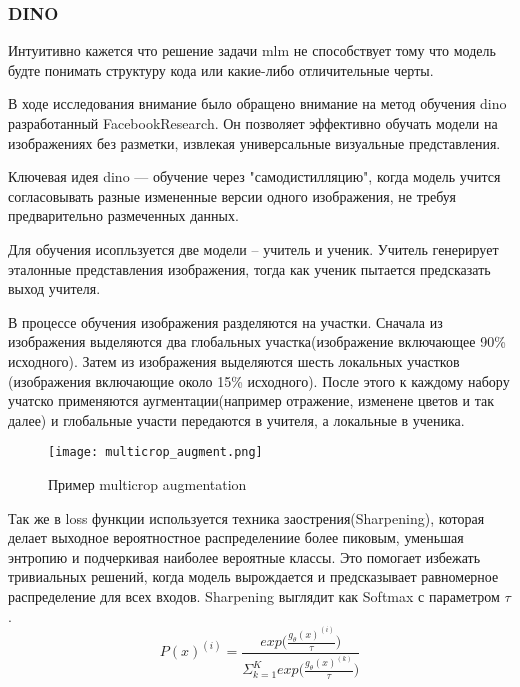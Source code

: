 \documentclass[../part_1.tex]{subfiles}
\begin{document}
    \subsubsection{DINO}

    \par Интуитивно кажется что решение задачи \acrshort{mlm} не способствует тому что модель будте понимать структуру кода или какие-либо отличительные черты. 
    \par В ходе исследования внимание было обращено внимание на метод обучения \acrshort{dino}\cite{caron2021emergingpropertiesselfsupervisedvision} разработанный FacebookResearch. Он позволяет эффективно обучать модели на изображениях без разметки, извлекая универсальные визуальные представления. 
    \par Ключевая идея \acrshort{dino} — обучение через "самодистилляцию", когда модель учится согласовывать разные измененные версии одного изображения, не требуя предварительно размеченных данных.
    \par Для обучения исопльзуется две модели -- учитель и ученик. Учитель генерирует эталонные представления изображения, тогда как ученик пытается предсказать выход учителя. 
    \par В процессе обучения изображения разделяются на участки. Сначала из изображения выделяются два глобальных участка(изображение включающее 90\% исходного). Затем из изображения выделяются шесть локальных участков (изображения включающие около 15\% исходного). После этого к каждому набору учатско применяются аугментации(например отражение, изменене цветов и так далее) и глобальные участи передаются в учителя, а локальные в ученика.
    \begin{figure}[h]
        \centering
        \texttt{[image: multicrop\_augment.png]}
        \caption{Пример multicrop augmentation}
        \label{fig:multicrop_augment}
    \end{figure}
    \par Так же в loss функции используется техника заострения(Sharpening), которая делает выходное вероятностное распределениие более пиковым, уменьшая энтропию и подчеркивая наиболее вероятные классы. Это помогает избежать тривиальных решений, когда модель вырождается  и предсказывает равномерное распределение для всех входов. Sharpening выглядит как Softmax с параметром $\tau$.
    \begin{equation}
        \label{sharpening}
        P(x)^{(i)} = \frac{exp\Big(\frac{g_\theta(x)^{(i)}}{\tau}\Big)}{\Sigma^K_{k=1}exp\Big(\frac{g_\theta(x)^{(k)}}{\tau}\Big)}
    \end{equation}
\end{document}
